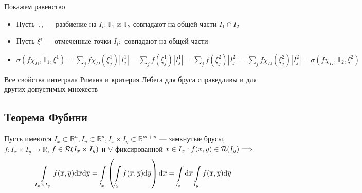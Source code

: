 \documentclass[a4paper, 10pt]{article}
\begin{document}
Покажем равенство
\begin{itemize}
    \item Пусть $\mathbb{T}_i$ — разбиение на $I_i:\mathbb{T}_1$ и $\mathbb{T}_2$ совпадают на общей части $I_1\cap I_2$
    \item Пусть $\xi^i$ — отмеченные точки $I_i:$ совпадают на общей части
    \item $\sigma(f\chi_D,\mathbb{T}_1,\xi^1)=\sum_{j}f\chi_D(\xi^1_j)|I_j^1|=\sum_j f(\xi^1_j)|I^1_j|=\sum_j f(\xi^2_j)|I^2_j|=\sum_j f\chi_D(\xi_j^2)|I_j^2|=\sigma(f\chi_D, \mathbb{T}_2, \xi^2)$
\end{itemize}

\comment Все свойства интеграла Римана и критерия Лебега для бруса справедливы и для других допустимых множеств
 
\subsection{Теорема Фубини}
Пусть имеются $I_x\subset\mathbb{R}^n, I_y\subset\mathbb{R}^n, I_x\times I_y\subset \mathbb{R}^{m+n}$ — замкнутые брусы, $f:I_x\times I_y\rightarrow \mathbb{R}$, $f\in\mathcal{R}(I_x\times I_y)$ и $\forall$ фиксированной $x\in I_x:f(x,y)\in\mathcal{R}(I_y)\Longrightarrow$
\begin{equation*}
    \int\limits_{I_x\times I_y} f(\overline{x}, \overline{y})\text{d}\overline{x}\text{d}\overline{y}=\int\limits_{I_x}\left(\int\limits_{I_y}f(\overline{x},\overline{y})\text{d}\overline{y}\right)\text{d}\overline{x}=\int\limits_{I_x}\text{d}\overline{x}\int\limits_{I_y}f(\overline{x}, \overline{y})\text{d}\overline{y}
\end{equation*}
\end{document}
